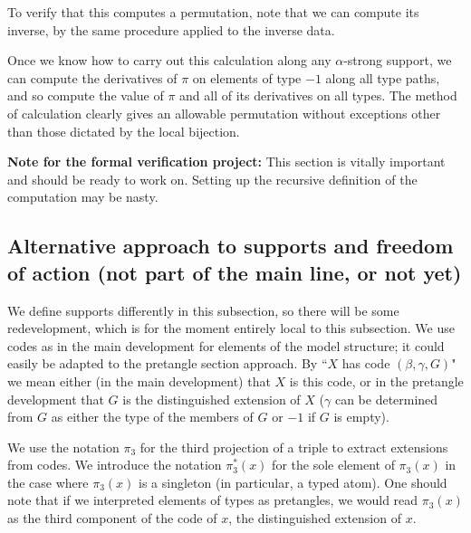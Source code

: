 \documentclass[112pt]{article}
\begin{document}
\begin{description}
To verify that this computes a permutation, note that we can compute its inverse, by the same procedure applied to the inverse data.

Once we know how to carry out this calculation along any $\alpha$-strong support, we can compute the derivatives of $\pi$ on elements of type $-1$  along all type paths, and so compute the value of $\pi$ and all of its derivatives on all types.  The method of calculation clearly gives an allowable permutation without exceptions other than those dictated by the local bijection.

\end{description}
{\bf Note for the formal verification project:}  This section is vitally important and should be ready to work on.  Setting up the recursive definition of the computation may be nasty.

\newpage

\subsection{Alternative approach to supports and freedom of action (not part of the main line, or not yet)}

We define supports differently in this subsection, so there will be some redevelopment, which is for the moment entirely local to this subsection.  We use
codes as in the main development for elements of the model structure;  it could easily be adapted to the pretangle section approach.  By ``$X$ has code $(\beta,\gamma,G)$" we mean either (in the main development) that $X$ is this code, or in the pretangle development that $G$ is the distinguished extension of $X$ ($\gamma$ can be determined from $G$ as either the type of the members of $G$ or $-1$ if $G$ is empty).

We use the notation $\pi_3$ for the third projection of a triple to extract extensions from codes.  We introduce the notation $\pi_3^*(x)$ for the sole element of $\pi_3(x)$ in the case where $\pi_3(x)$ is a singleton (in particular, a typed atom).  One should note that if we interpreted elements of types
as pretangles, we would read $\pi_3(x)$ as the third component of the code of $x$, the distinguished extension of $x$.
\end{document}
